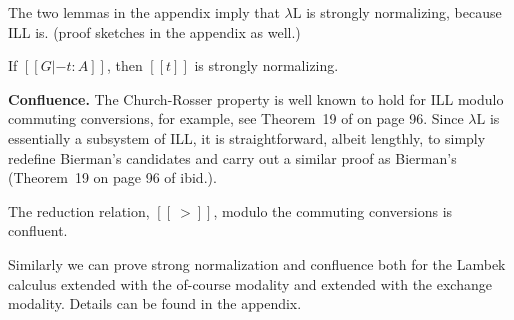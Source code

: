 \documentclass{llncs}
\newcommand{\redto}{\rightsquigarrow}
\begin{document}
The  two lemmas in the appendix  imply that $\lambda\text{L}$ is strongly
normalizing, because ILL is. (proof sketches in the appendix as well.)

\begin{theorem}
  \label{corollary:strong_normalization}
  If $[[G |- t : A]]$, then $[[t]]$ is strongly normalizing.
\end{theorem}

\iffalse
\begin{proof}
  Suppose $[[t]]$ is not strongly normalizing.  Then there exists at
  least one infinite descending chain starting with $[[t]]$ of the
  form $[[t]] \redto [[t']] \redto [[t'']] \redto
  \cdots$. Lemma~\ref{lemma:reduction_preserving_embedding} implies
  that there must also be an infinite descending chain of the form
  $[[t e]] \redto [[t' e]] \redto [[t'' e]] \redto \cdots$, but we
  know this is impossible, because ILL is strongly normalizing.
\end{proof}
\fi 

\textbf{Confluence.} The Church-Rosser property is well known to hold
for ILL modulo commuting conversions, for example, see Theorem~19 of
\cite{Bierman:1994} on page 96.  Since $\lambda\text{L}$ is
essentially a subsystem of ILL, it is straightforward, albeit
lengthly, to simply redefine Bierman's candidates 
and carry out a similar proof as Bierman's (Theorem~19 on page 96 of ibid.).  
\begin{theorem}[Confluence]
  \label{thm:confluence}
  The reduction relation, $[[~>]]$, modulo the commuting conversions
  is confluent.
\end{theorem}

Similarly we can prove strong normalization and confluence both for the Lambek calculus extended with the of-course modality and extended with the exchange modality. Details can be found in the appendix.


\iffalse
\end{document}
